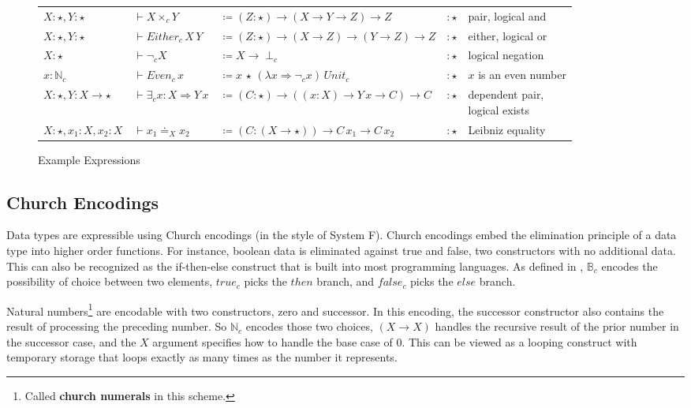 \begin{sidewaysfigure}
\begin{tabular}{lllll}
$X:\star,Y:\star$ & $\vdash X\times_{c}Y$ & $\coloneqq\left(Z:\star\right)\rightarrow(X\rightarrow Y\rightarrow Z)\rightarrow Z$ & $:\star$ & pair, logical and\tabularnewline
$X:\star,Y:\star$ & $\vdash Either_{c}\,X\,Y$ & $\coloneqq\left(Z:\star\right)\rightarrow(X\rightarrow Z)\rightarrow(Y\rightarrow Z)\rightarrow Z$ & $:\star$ & either, logical or\tabularnewline
$X:\star$ & $\vdash\lnot_{c}X$ & $\coloneqq X\rightarrow\perp_{c}$ & $:\star$ & logical negation\tabularnewline
$x:\mathbb{N}_{c}$ & $\vdash Even_{c}\,x$ & $\coloneqq x\,\star\,\left(\lambda x\Rightarrow\lnot_{c}x\right)\,Unit_{c}$ & $:\star$ & $x$ is an even number\tabularnewline
$X:\star,Y:X\rightarrow\star$ & $\vdash\exists_{c}x:X\Rightarrow Y\,x$ & $\coloneqq\left(C:\star\right)\rightarrow\left((x:X)\rightarrow Y\,x\rightarrow C\right)\rightarrow C$ & $:\star$ & \makecell[l]{dependent pair,\\ logical exists}\tabularnewline
$X:\star,x_{1}:X,x_{2}:X$ & $\vdash x_{1}\doteq_{X}x_{2}$ & $\coloneqq\left(C:\left(X\rightarrow\star\right)\right)\rightarrow C\,x_{1}\rightarrow C\,x_{2}$ & $:\star$ & Leibniz equality\tabularnewline
\end{tabular}


\caption{Example \SLang{} Expressions}
\label{fig:surface-examples}
\end{sidewaysfigure}

\subsection{Church Encodings}

Data types are expressible using Church encodings (in the style of System F).
Church encodings embed the elimination principle of a data type into higher order functions.
For instance, boolean data is eliminated against true and false, two constructors with no additional data.
This can also be recognized as the if-then-else construct that is built into most programming languages.
As defined in , $\mathbb{B}_{c}$ encodes the possibility of choice between two elements, $true_{c}$ picks the $then$ branch, and $false_{c}$ picks the $else$ branch.

Natural numbers\footnote{
  Called \textbf{church numerals} in this scheme.
} are encodable with two constructors, zero and successor.
In this encoding, the successor constructor also contains the result of processing the preceding number.
So $\mathbb{N}_{c}$ encodes those two choices, $(X\rightarrow X)$ handles the recursive result of the prior number in the successor case, and the $X$ argument specifies how to handle the base case of $0$.
This can be viewed as a looping construct with temporary storage that loops exactly as many times as the number it represents.

